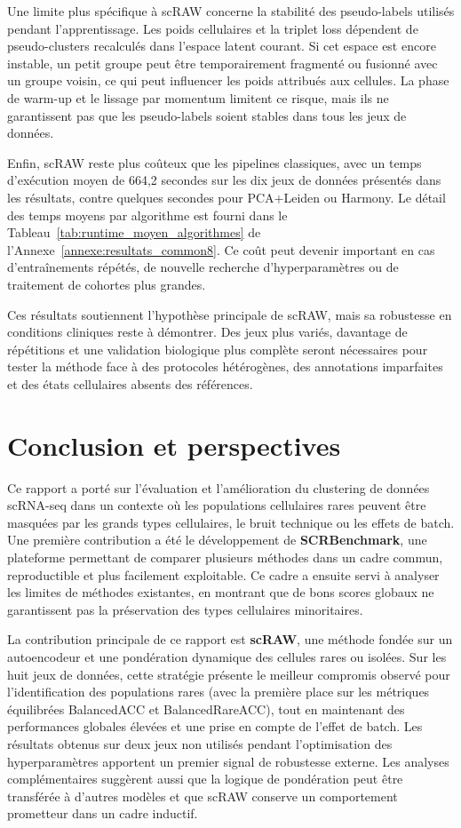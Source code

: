 Une limite plus spécifique à scRAW concerne la stabilité des pseudo-labels utilisés pendant l'apprentissage. Les poids cellulaires et la triplet loss dépendent de pseudo-clusters recalculés dans l'espace latent courant. Si cet espace est encore instable, un petit groupe peut être temporairement fragmenté ou fusionné avec un groupe voisin, ce qui peut influencer les poids attribués aux cellules. La phase de warm-up et le lissage par momentum limitent ce risque, mais ils ne garantissent pas que les pseudo-labels soient stables dans tous les jeux de données.

Enfin, scRAW reste plus coûteux que les pipelines classiques, avec un temps d'exécution moyen de 664,2 secondes sur les dix jeux de données présentés dans les résultats, contre quelques secondes pour PCA+Leiden ou Harmony. Le détail des temps moyens par algorithme est fourni dans le Tableau~\ref{tab:runtime_moyen_algorithmes} de l'Annexe~\ref{annexe:resultats_common8}. Ce coût peut devenir important en cas d'entraînements répétés, de nouvelle recherche d'hyperparamètres ou de traitement de cohortes plus grandes.

Ces résultats soutiennent l'hypothèse principale de scRAW, mais sa robustesse en conditions cliniques reste à démontrer. Des jeux plus variés, davantage de répétitions et une validation biologique plus complète seront nécessaires pour tester la méthode face à des protocoles hétérogènes, des annotations imparfaites et des états cellulaires absents des références.

\section*{Conclusion et perspectives}

Ce rapport a porté sur l'évaluation et l'amélioration du clustering de données scRNA-seq dans un contexte où les populations cellulaires rares peuvent être masquées par les grands types cellulaires, le bruit technique ou les effets de batch. Une première contribution a été le développement de \textbf{SCRBenchmark}, une plateforme permettant de comparer plusieurs méthodes dans un cadre commun, reproductible et plus facilement exploitable. Ce cadre a ensuite servi à analyser les limites de méthodes existantes, en montrant que de bons scores globaux ne garantissent pas la préservation des types cellulaires minoritaires.

La contribution principale de ce rapport est \textbf{scRAW}, une méthode fondée sur un autoencodeur et une pondération dynamique des cellules rares ou isolées. Sur les huit jeux de données, cette stratégie présente le meilleur compromis observé pour l'identification des populations rares (avec la première place sur les métriques équilibrées BalancedACC et BalancedRareACC), tout en maintenant des performances globales élevées et une prise en compte de l'effet de batch. Les résultats obtenus sur deux jeux non utilisés pendant l'optimisation des hyperparamètres apportent un premier signal de robustesse externe. Les analyses complémentaires suggèrent aussi que la logique de pondération peut être transférée à d'autres modèles et que scRAW conserve un comportement prometteur dans un cadre inductif.

